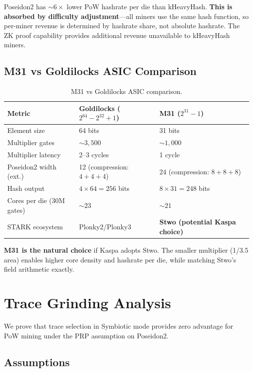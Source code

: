 \documentclass[11pt,a4paper]{article}
\begin{document}
Poseidon2 has ${\sim}6\times$ lower PoW hashrate per die than kHeavyHash. \textbf{This is absorbed by difficulty adjustment}---all miners use the same hash function, so per-miner revenue is determined by hashrate share, not absolute hashrate. The ZK proof capability provides additional revenue unavailable to kHeavyHash miners.

\subsection{M31 vs Goldilocks ASIC Comparison}

\begin{table}[h]
\centering
\begin{tabular}{@{}lll@{}}
\toprule
Metric & Goldilocks ($2^{64}-2^{32}+1$) & M31 ($2^{31}-1$) \\
\midrule
Element size & 64 bits & 31 bits \\
Multiplier gates & ${\sim}3{,}500$ & ${\sim}1{,}000$ \\
Multiplier latency & 2--3 cycles & 1 cycle \\
Poseidon2 width (ext.) & 12 (compression: $4{+}4{+}4$) & 24 (compression: $8{+}8{+}8$) \\
Hash output & $4 \times 64 = 256$ bits & $8 \times 31 = 248$ bits \\
Cores per die (30M gates) & ${\sim}23$ & ${\sim}21$ \\
STARK ecosystem & Plonky2/Plonky3 & \textbf{Stwo (potential Kaspa choice)} \\
\bottomrule
\end{tabular}
\caption{M31 vs Goldilocks ASIC comparison.}
\label{tab:m31-vs-gold}
\end{table}

\textbf{M31 is the natural choice} if Kaspa adopts Stwo. The smaller multiplier (1/3.5 area) enables higher core density and hashrate per die, while matching Stwo's field arithmetic exactly.

\section{Trace Grinding Analysis}
\label{app:tracegrinding}

We prove that trace selection in Symbiotic mode provides zero advantage for PoW mining under the PRP assumption on Poseidon2.

\subsection{Assumptions}
\end{document}
